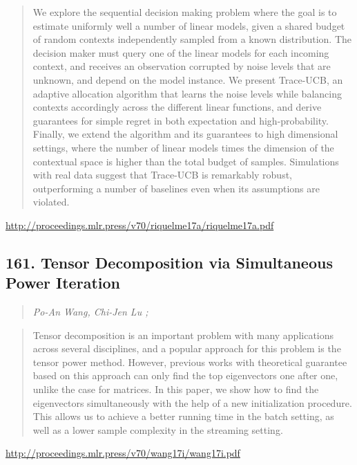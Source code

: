 \documentclass{article}
\begin{document}
\begin{quote}
    We explore the sequential decision making problem where the goal is to estimate uniformly well a number of linear models, given a shared budget of random contexts independently sampled from a known distribution. The decision maker must query one of the linear models for each incoming context, and receives an observation corrupted by noise levels that are unknown, and depend on the model instance. We present Trace-UCB, an adaptive allocation algorithm that learns the noise levels while balancing contexts accordingly across the different linear functions, and derive guarantees for simple regret in both expectation and high-probability. Finally, we extend the algorithm and its guarantees to high dimensional settings, where the number of linear models times the dimension of the contextual space is higher than the total budget of samples. Simulations with real data suggest that Trace-UCB is remarkably robust, outperforming a number of baselines even when its assumptions are violated.  \end{quote}

\href{http://proceedings.mlr.press/v70/riquelme17a/riquelme17a.pdf}{http://proceedings.mlr.press/v70/riquelme17a/riquelme17a.pdf}

\subsection{161. Tensor Decomposition via Simultaneous Power Iteration}

\begin{quote}
\footnotesize{\textit{Po-An Wang, Chi-Jen Lu ;}}
\end{quote}

\begin{quote}
    Tensor decomposition is an important problem with many applications across several disciplines, and a popular approach for this problem is the tensor power method. However, previous works with theoretical guarantee based on this approach can only find the top eigenvectors one after one, unlike the case for matrices. In this paper, we show how to find the eigenvectors simultaneously with the help of a new initialization procedure. This allows us to achieve a better running time in the batch setting, as well as a lower sample complexity in the streaming setting.  \end{quote}

\href{http://proceedings.mlr.press/v70/wang17i/wang17i.pdf}{http://proceedings.mlr.press/v70/wang17i/wang17i.pdf}
\end{document}
